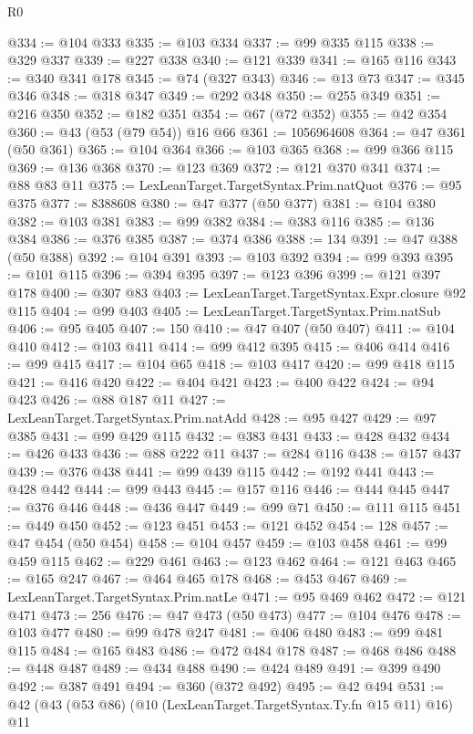 \begin{lexlean}{R0}
\begin{coremodule}
@334 := @104 @333
@335 := @103 @334
@337 := @99 @335 @115
@338 := @329 @337
@339 := @227 @338
@340 := @121 @339
@341 := @165 @116
@343 := @340 @341 @178
@345 := @74 (@327 @343)
@346 := @13 @73
@347 := @345 @346
@348 := @318 @347
@349 := @292 @348
@350 := @255 @349
@351 := @216 @350
@352 := @182 @351
@354 := @67 (@72 @352)
@355 := @42 @354
@360 := @43 (@53 (@79 @54)) @16 @66
@361 := 1056964608
@364 := @47 @361 (@50 @361)
@365 := @104 @364
@366 := @103 @365
@368 := @99 @366 @115
@369 := @136 @368
@370 := @123 @369
@372 := @121 @370 @341
@374 := @88 @83 @11
@375 := LexLeanTarget.TargetSyntax.Prim.natQuot
@376 := @95 @375
@377 := 8388608
@380 := @47 @377 (@50 @377)
@381 := @104 @380
@382 := @103 @381
@383 := @99 @382
@384 := @383 @116
@385 := @136 @384
@386 := @376 @385
@387 := @374 @386
@388 := 134
@391 := @47 @388 (@50 @388)
@392 := @104 @391
@393 := @103 @392
@394 := @99 @393
@395 := @101 @115
@396 := @394 @395
@397 := @123 @396
@399 := @121 @397 @178
@400 := @307 @83
@403 := LexLeanTarget.TargetSyntax.Expr.closure @92 @115
@404 := @99 @403
@405 := LexLeanTarget.TargetSyntax.Prim.natSub
@406 := @95 @405
@407 := 150
@410 := @47 @407 (@50 @407)
@411 := @104 @410
@412 := @103 @411
@414 := @99 @412 @395
@415 := @406 @414
@416 := @99 @415
@417 := @104 @65
@418 := @103 @417
@420 := @99 @418 @115
@421 := @416 @420
@422 := @404 @421
@423 := @400 @422
@424 := @94 @423
@426 := @88 @187 @11
@427 := LexLeanTarget.TargetSyntax.Prim.natAdd
@428 := @95 @427
@429 := @97 @385
@431 := @99 @429 @115
@432 := @383 @431
@433 := @428 @432
@434 := @426 @433
@436 := @88 @222 @11
@437 := @284 @116
@438 := @157 @437
@439 := @376 @438
@441 := @99 @439 @115
@442 := @192 @441
@443 := @428 @442
@444 := @99 @443
@445 := @157 @116
@446 := @444 @445
@447 := @376 @446
@448 := @436 @447
@449 := @99 @71
@450 := @111 @115
@451 := @449 @450
@452 := @123 @451
@453 := @121 @452
@454 := 128
@457 := @47 @454 (@50 @454)
@458 := @104 @457
@459 := @103 @458
@461 := @99 @459 @115
@462 := @229 @461
@463 := @123 @462
@464 := @121 @463
@465 := @165 @247
@467 := @464 @465 @178
@468 := @453 @467
@469 := LexLeanTarget.TargetSyntax.Prim.natLe
@471 := @95 @469 @462
@472 := @121 @471
@473 := 256
@476 := @47 @473 (@50 @473)
@477 := @104 @476
@478 := @103 @477
@480 := @99 @478 @247
@481 := @406 @480
@483 := @99 @481 @115
@484 := @165 @483
@486 := @472 @484 @178
@487 := @468 @486
@488 := @448 @487
@489 := @434 @488
@490 := @424 @489
@491 := @399 @490
@492 := @387 @491
@494 := @360 (@372 @492)
@495 := @42 @494
@531 := @42
    (@43
      (@53 @86)
      (@10 (LexLeanTarget.TargetSyntax.Ty.fn @15 @11) @16)
      @11

\end{coremodule}
\end{lexlean}
